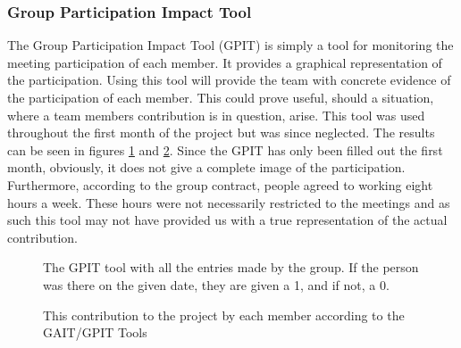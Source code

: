 \subsubsection{Group Participation Impact Tool}
The Group Participation Impact Tool (GPIT) is simply a tool for monitoring the meeting participation of each member. It provides a graphical representation of the participation. Using this tool will provide the team with concrete evidence of the participation of each member. This could prove useful, should a situation, where a team members contribution is in question, arise. This tool was used throughout the first month of the project but was since neglected. The results can be seen in figures \ref{fig:GPIT} and \ref{fig:GPITGraph}. Since the GPIT has only been filled out the first month, obviously, it does not give a complete image of the participation. Furthermore, according to the group contract, people agreed to working eight hours a week. These hours were not necessarily restricted to the meetings and as such this tool may not have provided us with a true representation of the actual contribution.


\begin{figure}[h!]
	\caption{The GPIT tool with all the entries made by the group. If the person was there on the given date, they are given a 1, and if not, a 0. }
	\label{fig:GPIT}
\end{figure}

\begin{figure}[h!]
	\caption{This contribution to the project by each member according to the GAIT/GPIT Tools}
	\label{fig:GPITGraph}
\end{figure}